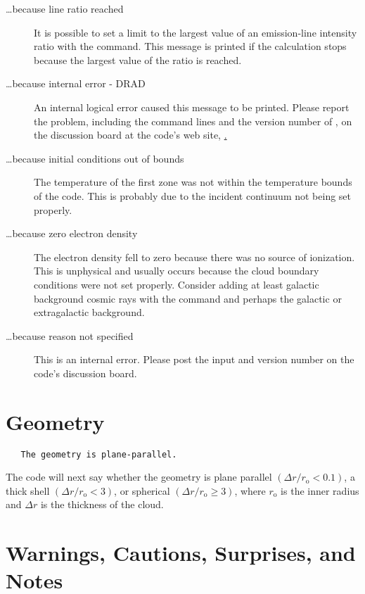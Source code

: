 \begin{description}
\item[\dots because line ratio reached]  It is possible to set a limit to the
largest value of an emission-line intensity ratio with the  command.
This message is printed if the calculation stops because the largest value
of the ratio is reached.

\item[\dots because internal error - DRAD]  An internal logical error caused
this message to be printed. Please report the problem, including the command
lines and the version number of \Cloudy, on the discussion board at the code's
web site, \href{www.nublado.org}.

\item[\dots because initial conditions out of bounds]  The temperature of the
first zone was not within the temperature bounds of the code.  This is
probably due to the incident continuum not being set properly.

\item[\dots because zero electron density]  The electron density fell to zero
because there was no source of ionization.  This is unphysical and usually
occurs because the cloud boundary conditions were not set properly.  Consider
adding at least galactic background cosmic rays with the  command and perhaps the galactic or extragalactic background.

\item[\dots because reason not specified] This is an internal error. Please post
the input and version number on the code's discussion board.
\end{description}

\section{Geometry}
{\setverbatimfontsize{\tiny}
\begin{verbatim}
   The geometry is plane-parallel.
\end{verbatim}
}

The code will next say whether the geometry is plane parallel $(\Delta
  r/r_{\mathrm{o}} <
0.1 )$, a thick shell $(\Delta r/r_{\mathrm{o}} < 3 )$, or spherical  $(\Delta
r/r_{\mathrm{o}}\ge  3 )$, where $r_{\mathrm{o}}$ is
the inner radius and $\Delta r$ is the thickness of the cloud.

\section{Warnings, Cautions, Surprises, and Notes}

